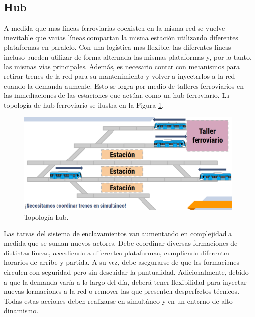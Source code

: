 \subsection{Hub}

A medida que mas líneas ferroviarias coexisten en la misma red se vuelve inevitable que varias líneas compartan la misma estación utilizando diferentes plataformas en paralelo. Con una logística mas flexible, las diferentes líneas incluso pueden utilizar de forma alternada las mismas plataformas y, por lo tanto, las mismas vías principales. Además, es necesario contar con mecanismos para retirar trenes de la red para su mantenimiento y volver a inyectarlos a la red cuando la demanda aumente. Esto se logra por medio de talleres ferroviarios en las inmediaciones de las estaciones que actúan como un hub ferroviario. La topología de hub ferroviario se ilustra en la Figura \ref{fig:hub_1}.

    \begin{figure}[h]
        \centering
        \includegraphics[width=1\textwidth]{Figuras/hub}
        \centering\caption{Topología hub.}
        \label{fig:hub_1}
    \end{figure}
    
Las tareas del sistema de enclavamientos van aumentando en complejidad a medida que se suman nuevos actores. Debe coordinar diversas formaciones de distintas líneas, accediendo a diferentes plataformas, cumpliendo diferentes horarios de arribo y partida. A su vez, debe asegurarse de que las formaciones circulen con seguridad pero sin descuidar la puntualidad. Adicionalmente, debido a que la demanda varía a lo largo del día, deberá tener flexibilidad para inyectar nuevas formaciones a la red o remover las que presenten desperfectos técnicos. Todas estas acciones deben realizarse en simultáneo y en un entorno de alto dinamismo.
